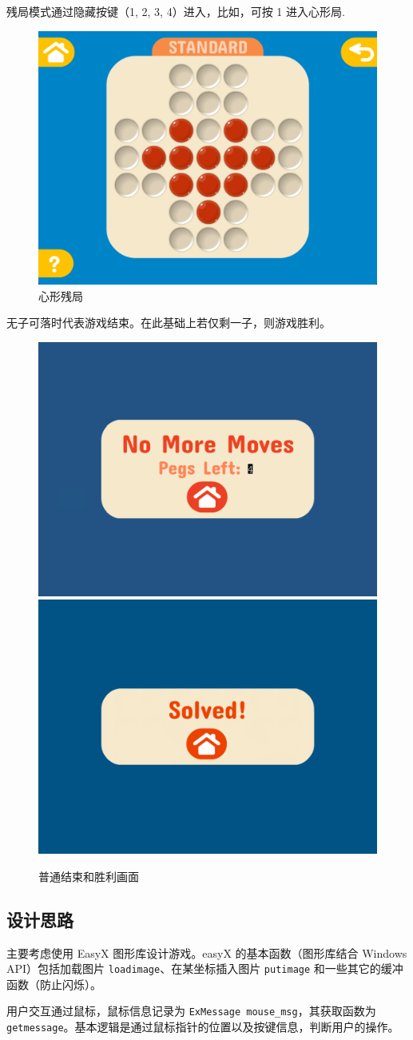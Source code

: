 \documentclass[12pt,a4paper,twoside]{ctexart}
\numberwithin{figure}{section}
\numberwithin{equation}{section}
\begin{document}
残局模式通过隐藏按键（1, 2, 3, 4）进入，比如，可按 1 进入心形局.
\begin{figure}[ht]
    \centering
    \includegraphics[width=.45\textwidth]{heart.png}
    \caption{心形残局}
\end{figure}

无子可落时代表游戏结束。在此基础上若仅剩一子，则游戏胜利。
\begin{figure}[ht]
    \centering
    \includegraphics[width=.45\textwidth]{end.png}
    \quad
    \includegraphics[width=.45\textwidth]{solved.png}
    \caption{普通结束和胜利画面}
\end{figure}

\subsection{设计思路}
主要考虑使用 EasyX 图形库设计游戏。easyX 的基本函数（图形库结合 Windows API）包括加载图片 \verb|loadimage|、在某坐标插入图片 \verb|putimage| 和一些其它的缓冲函数（防止闪烁）。

用户交互通过鼠标，鼠标信息记录为 \verb|ExMessage mouse_msg|，其获取函数为 \verb|getmessage|。基本逻辑是通过鼠标指针的位置以及按键信息，判断用户的操作。
\end{document}
